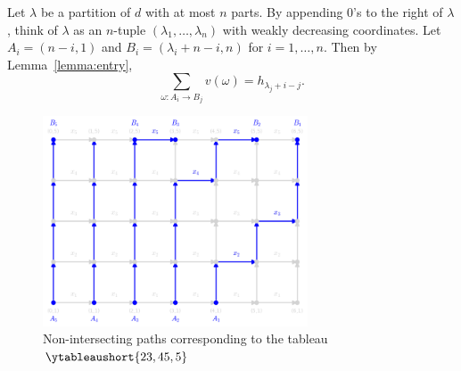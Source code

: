 \documentclass[11pt]{amsart}
\theoremstyle{definition}
\theoremstyle{example}
\begin{document}
Let $\lambda$ be a partition of $d$ with at most $n$ parts.
By appending $0$'s to the right of $\lambda$, think of $\lambda$ as an $n$-tuple $(\lambda_1,\dotsc, \lambda_n)$ with weakly decreasing coordinates.
Let $A_i = (n-i, 1)$ and $B_i=(\lambda_i+n-i, n)$ for $i=1,\dotsc, n$.
Then  by Lemma~\ref{lemma:entry},
\begin{displaymath}
  \sum_{\omega:A_i\to B_j} v(\omega) = h_{\lambda_j+i-j}.
\end{displaymath}
\begin{figure}
  \centering
  \includegraphics[width=0.7\textwidth]{jt.png}
  \caption{Non-intersecting paths corresponding to the tableau $\ytableaushort{23,45,5}$}
  \label{fig:jacobi-trudi}
\end{figure}
\end{document}
